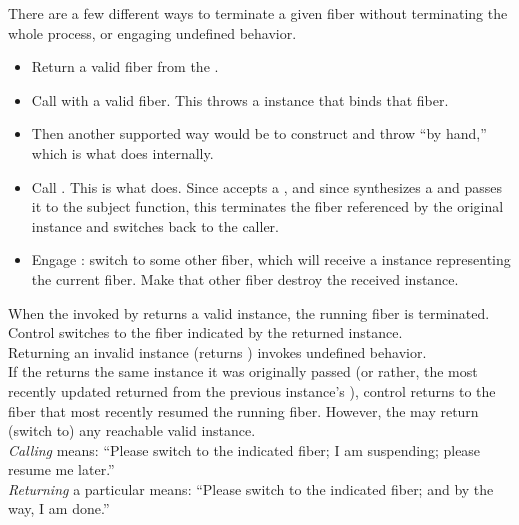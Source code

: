 
There are a few different ways to terminate a given fiber without
terminating the whole process, or engaging undefined behavior.

\begin{itemize}
    \item Return a valid fiber from the \entryfn.
    \item Call \unwindfib with a valid fiber. This throws a \unwindex
          instance that binds that fiber.
    \item Then another supported way would be to construct and throw \unwindex
          ``by hand,'' which is what \unwindfib does internally.
    \item Call .
          This is what \dtor does. Since \unwindfib accepts a \fiber, and
          since \resumewith synthesizes a \fiber and passes it to the subject
          function, this terminates the fiber referenced by the original
          \fiber instance and switches back to the caller.
    \item Engage \dtor: switch to some other fiber, which will
          receive a \fiber instance representing the current fiber. Make that
          other fiber destroy the received \fiber instance.
\end{itemize}

When the \entryfn invoked by \resume returns a valid \fiber instance, the
running fiber is terminated. Control switches to the fiber indicated by the
returned \fiber instance.\\

Returning an invalid \fiber instance (\opbool returns ) invokes
undefined behavior.\\

If the \entryfn returns the same \fiber instance it was originally passed (or
rather, the most recently updated \fiber returned from the previous instance's
\resume), control returns to the fiber that most recently resumed the running
fiber. However, the \entryfn may return (switch to) any reachable valid \fiber
instance.\\

\emph{Calling} \resume means: ``Please switch to the indicated fiber; I
am suspending; please resume me later.''\\

\emph{Returning} a particular \fiber means: ``Please switch to the indicated
fiber; and by the way, I am done.''
